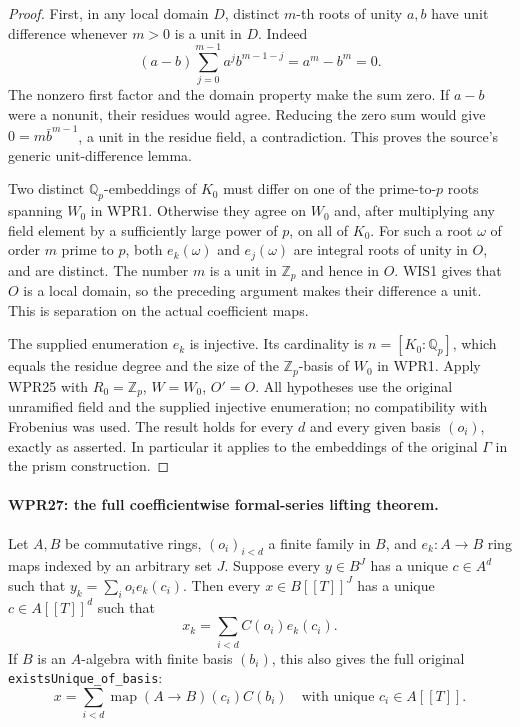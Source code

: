 \begin{proof}
First, in any local domain $D$, distinct $m$-th roots of unity
$a,b$ have unit difference whenever $m>0$ is a unit in $D$.
Indeed
\[
 (a-b)\sum_{j=0}^{m-1}a^j b^{m-1-j}=a^m-b^m=0.
\]
The nonzero first factor and the domain property make the sum
zero. If $a-b$ were a nonunit, their residues would agree.
Reducing the zero sum would give
$0=m\bar b^{m-1}$, a unit in the residue field, a contradiction.
This proves the source's generic unit-difference lemma.

Two distinct $\mathbb Q_p$-embeddings of $K_0$ must differ on
one of the prime-to-$p$ roots spanning $W_0$ in WPR1. Otherwise
they agree on $W_0$ and, after multiplying any field element
by a sufficiently large power of $p$, on all of $K_0$.
For such a root $\omega$ of order $m$ prime to $p$, both
$e_k(\omega)$ and $e_j(\omega)$ are integral roots of unity
in $O$, and are distinct. The number $m$ is a unit in
$\mathbb Z_p$ and hence in $O$. WIS1 gives that $O$ is a
local domain, so the preceding argument makes their difference
a unit. This is separation on the actual coefficient maps.

The supplied enumeration $e_k$ is injective. Its cardinality
is $n=[K_0:\mathbb Q_p]$, which equals the residue degree
and the size of the $\mathbb Z_p$-basis of $W_0$ in WPR1.
Apply WPR25 with $R_0=\mathbb Z_p$, $W=W_0$, $O'=O$.
All hypotheses use the original unramified field and the
supplied injective enumeration; no compatibility with Frobenius
was used. The result holds for every $d$ and every given
basis $(o_i)$, exactly as asserted. In particular it applies
to the embeddings of the original $\Gamma$ in the prism
construction.
\end{proof}

\paragraph{WPR27: the full coefficientwise formal-series lifting theorem.}
\label{claim:WPR27}
Let $A,B$ be commutative rings, $(o_i)_{i<d}$ a finite family
in $B$, and $e_k:A\to B$ ring maps indexed by an arbitrary
set $J$. Suppose every $y\in B^J$ has a unique $c\in A^d$
such that $y_k=\sum_i o_i e_k(c_i)$. Then every
$x\in B[[T]]^J$ has a unique $c\in A[[T]]^d$ such that
\[
                  x_k=\sum_{i<d}C(o_i)e_k(c_i).
 \tag{WPR.32}
\]
If $B$ is an $A$-algebra with finite basis $(b_i)$, this also
gives the full original \texttt{existsUnique\_\allowbreak of\_\allowbreak basis}:
\[
 x=\sum_{i<d}\operatorname{map}(A\to B)(c_i)C(b_i)
 \quad\text{with unique }c_i\in A[[T]].                      \tag{WPR.33}
\]


